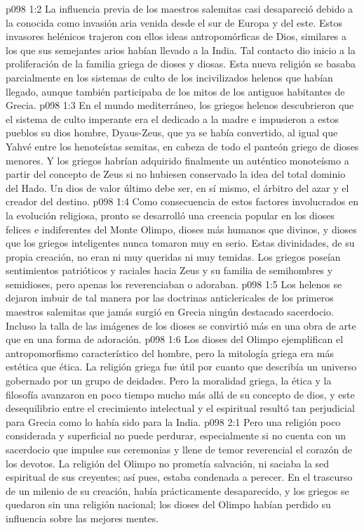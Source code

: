 \vs p098 1:2 La influencia previa de los maestros salemitas casi desapareció debido a la conocida como invasión aria venida desde el sur de Europa y del este. Estos invasores helénicos trajeron con ellos ideas antropomórficas de Dios, similares a los que sus semejantes arios habían llevado a la India. Tal contacto dio inicio a la proliferación de la familia griega de dioses y diosas. Esta nueva religión se basaba parcialmente en los sistemas de culto de los incivilizados helenos que habían llegado, aunque también participaba de los mitos de los antiguos habitantes de Grecia.
\vs p098 1:3 En el mundo mediterráneo, los griegos helenos descubrieron que el sistema de culto imperante era el dedicado a la madre e impusieron a estos pueblos su dios hombre, Dyaus\hyp{}Zeus, que ya se había convertido, al igual que Yahvé entre los henoteístas semitas, en cabeza de todo el panteón griego de dioses menores. Y los griegos habrían adquirido finalmente un auténtico monoteísmo a partir del concepto de Zeus si no hubiesen conservado la idea del total dominio del Hado. Un dios de valor último debe ser, en sí mismo, el árbitro del azar y el creador del destino.
\vs p098 1:4 Como consecuencia de estos factores involucrados en la evolución religiosa, pronto se desarrolló una creencia popular en los dioses felices e indiferentes del Monte Olimpo, dioses más humanos que divinos, y dioses que los griegos inteligentes nunca tomaron muy en serio. Estas divinidades, de su propia creación, no eran ni muy queridas ni muy temidas. Los griegos poseían sentimientos patrióticos y raciales hacia Zeus y su familia de semihombres y semidioses, pero apenas los reverenciaban o adoraban.
\vs p098 1:5 Los helenos se dejaron imbuir de tal manera por las doctrinas anticlericales de los primeros maestros salemitas que jamás surgió en Grecia ningún destacado sacerdocio. Incluso la talla de las imágenes de los dioses se convirtió más en una obra de arte que en una forma de adoración.
\vs p098 1:6 Los dioses del Olimpo ejemplifican el antropomorfismo característico del hombre, pero la mitología griega era más estética que ética. La religión griega fue útil por cuanto que describía un universo gobernado por un grupo de deidades. Pero la moralidad griega, la ética y la filosofía avanzaron en poco tiempo mucho más allá de su concepto de dios, y este desequilibrio entre el crecimiento intelectual y el espiritual resultó tan perjudicial para Grecia como lo había sido para la India.
\vs p098 2:1 Pero una religión poco considerada y superficial no puede perdurar, especialmente si no cuenta con un sacerdocio que impulse sus ceremonias y llene de temor reverencial el corazón de los devotos. La religión del Olimpo no prometía salvación, ni saciaba la sed espiritual de sus creyentes; así pues, estaba condenada a perecer. En el trascurso de un milenio de su creación, había prácticamente desaparecido, y los griegos se quedaron sin una religión nacional; los dioses del Olimpo habían perdido su influencia sobre las mejores mentes.
